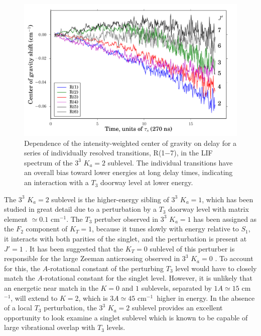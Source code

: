 \documentclass[12pt]{mitthesis}
\newcommand{\rcm}{cm$^{-1}$}
\newcommand{\Ka}[1]{$K_a\!\!=\!#1$}
\begin{document}
\begin{figure}
  \caption{Dependence of the intensity-weighted center of gravity on
    delay for a series of individually resolved transitions, R(1$-$7),
    in the LIF spectrum of the $3^3$ \Ka{2} sublevel.  The individual
    transitions have an overall bias toward lower energies at long
    delay times, indicating an interaction with a $T_3$ doorway level
    at lower energy.}
  \label{fig:33k2-cog-delay}
  \centering
  \includegraphics[width=6in]{33k2-r123456-cog-delay.pdf}
\end{figure}


The $3^3$ \Ka{2} sublevel is the higher-energy sibling of $3^3$
\Ka{1}, which has been studied in great detail due to a
perturbation by a $T_3$ doorway level with matrix element $\simeq
0.1$ \rcm.  The $T_3$ pertuber observed in $3^3$ \Ka{1} has been
assigned as the $F_2$ component of $K_T=1$, because 
it tunes slowly with energy relative to $S_1$,
it interacts with both parities of the singlet, and
the perturbation is present at $J'=1$
\cite{mishra04}.  It has been suggested that the $K_T=0$ sublevel of
this perturber is responsible for the large Zeeman anticrossing
observed in $3^3$ \Ka{0} \cite{thom07, dupre93}.  To account for this,
the $A$-rotational constant of the perturbing $T_3$ level would have
to closely match the $A$-rotational constant for the singlet level.  However, it is
unlikely that an energetic near match in the $K=0$ and $1$
sublevels, separated by $1A \simeq 15$ \rcm, will extend to $K=2$,
which is $3A \simeq 45$ \rcm\ higher in energy.  In the absence of a
local $T_3$ perturbation, the $3^3$ \Ka{2} sublevel provides an
excellent opportunity to look examine a singlet sublevel which is
known to be capable of large vibrational overlap with $T_3$ levels.
\end{document}
